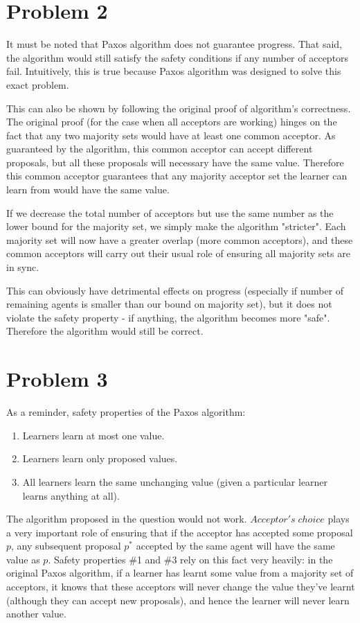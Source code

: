 \documentclass[10pt,letter]{article}
\begin{document}
\pagebreak

\section*{Problem 2}

It must be noted that Paxos algorithm does not guarantee progress. That said, the algorithm would still satisfy the safety conditions if any number of acceptors fail. Intuitively, this is true because Paxos algorithm was designed to solve this exact problem.

This can also be shown by following the original proof of algorithm's correctness. The original proof (for the case when all acceptors are working) hinges on the fact that any two majority sets would have at least one common acceptor. As guaranteed by the algorithm, this common acceptor can accept different proposals, but all these proposals will necessary have the same value. Therefore this common acceptor guarantees that any majority acceptor set the learner can learn from would have the same value.

If we decrease the total number of acceptors but use the same number as the lower bound for the majority set, we simply make the algorithm "stricter". Each majority set will now have a greater overlap (more common acceptors), and these common acceptors will carry out their usual role of ensuring all majority sets are in sync.

This can obviously have detrimental effects on progress (especially if number of remaining agents is smaller than our bound on majority set), but it does not violate the safety property -  if anything, the algorithm becomes more "safe". Therefore the algorithm would still be correct.

\section*{Problem 3}

As a reminder, safety properties of the Paxos algorithm:

\begin{enumerate}
\item Learners learn at most one value.
\item Learners learn only proposed values.
\item All learners learn the same unchanging value (given a particular learner learns anything at all).
\end{enumerate}

The algorithm proposed in the question would not work. $Acceptor's\; choice$ plays a very important role of ensuring that if the acceptor has accepted some proposal $p$, any subsequent proposal $p^*$ accepted by the same agent will have the same value as $p$. Safety properties \#1 and \#3 rely on this fact very heavily: in the original Paxos algorithm, if a learner has learnt some value from a majority set of acceptors, it knows that these acceptors will never change the value they've learnt (although they can accept new proposals), and hence the learner will never learn another value.
\end{document}
